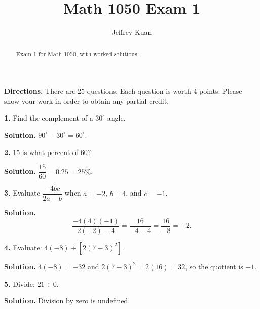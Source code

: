 \documentclass{ximera}
\author{Jeffrey Kuan}
\title{Math 1050 Exam 1}
\begin{document}
\begin{abstract}
    Exam 1 for Math 1050, with worked solutions.
\end{abstract}

\maketitle

\textbf{Directions.} There are 25 questions. Each question is worth 4 points. Please show
your work in order to obtain any partial credit.

\begin{problem}

\textbf{1.} Find the complement of a $30^{\circ}$ angle.

\begin{hint}
\textbf{Solution.} $90^{\circ}-30^{\circ}=60^{\circ}$.
\end{hint}
\end{problem}

\begin{problem}

\textbf{2.} 15 is what percent of 60?

\begin{hint}
\textbf{Solution.} $\dfrac{15}{60}=0.25=25\%$.
\end{hint}
\end{problem}

\begin{problem}

\textbf{3.} Evaluate $\dfrac{-4bc}{2a-b}$ when $a=-2$, $b=4$, and $c=-1$.

\begin{hint}
\textbf{Solution.}
\[
  \frac{-4(4)(-1)}{2(-2)-4}=\frac{16}{-4-4}=\frac{16}{-8}=-2 .
\]
\end{hint}
\end{problem}

\begin{problem}

\textbf{4.} Evaluate: $4(-8) \div\left[2(7-3)^{2}\right]$.

\begin{hint}
\textbf{Solution.} $4(-8)=-32$ and $2(7-3)^{2}=2(16)=32$, so the quotient is $-1$.
\end{hint}
\end{problem}

\begin{problem}

\textbf{5.} Divide: $21 \div 0$.

\begin{hint}
\textbf{Solution.} Division by zero is undefined.
\end{hint}
\end{problem}
\end{document}
